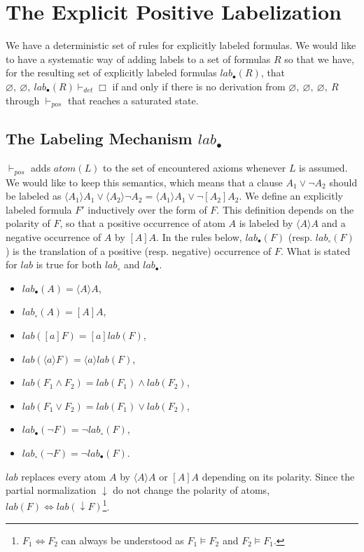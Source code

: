 \documentclass[a4paper,10pt]{article}
\newcommand{\atom}{\mathit{atom}}
\newcommand{\pos}{\vdash_\mathit{pos}}
\newcommand{\dett}{\vdash_\mathit{det}}
\newcommand{\T}{\mathit{lab}}
\begin{document}
\section{The Explicit Positive Labelization}
We have a deterministic set of rules for explicitly labeled formulas. We would like to have a 
systematic way of adding labels to a set of formulas $R$ so that we have, for the resulting set of
explicitly labeled formulas $\T_\bullet(R)$, that
$\varnothing,\ \varnothing,\ \T_\bullet(R)\dett\Box$ if and only if
there is no derivation from $\varnothing,\ \varnothing,\ \varnothing,\ R$ through $\pos$ that reaches
a saturated state.

\subsection{The Labeling Mechanism $\T_\bullet$}
$\pos$ adds $\atom(L)$ to the set of encountered axioms whenever $L$ is assumed. We would like to
keep this semantics, which means that a clause $A_1\vee\neg A_2$ should be labeled as
$\langle A_1\rangle A_1\vee\langle A_2\rangle\neg A_2=\langle A_1\rangle A_1\vee\neg [A_2]A_2$.
We define an explicitly labeled formula $F'$ inductively over the form of $F$. This definition
depends on the polarity of $F$, so that a positive occurrence of atom $A$ is labeled by
$\langle A\rangle A$ and a negative occurrence of $A$ by $[A]A$. In the rules below,
$\T_\bullet(F)$ (resp. $\T_\circ(F)$) is the translation of a positive (resp.
negative) occurrence of $F$. What is stated for $\T$ is true for both $\T_\circ$ and $\T_\bullet$.
\begin{itemize}
 \item $\T_\bullet(A)=\langle A\rangle A$,
 \item $\T_\circ(A)=[A]A$,
 \item $\T([a]F)=[a]\T(F)$,
 \item $\T(\langle a\rangle F)=\langle a\rangle\T(F)$,
 \item $\T(F_1\wedge F_2)=\T(F_1)\wedge\T(F_2)$,
 \item $\T(F_1\vee F_2)=\T(F_1)\vee\T(F_2)$,
 \item $\T_\bullet(\neg F)= \neg\T_\circ(F)$,
 \item $\T_\circ(\neg F)= \neg\T_\bullet(F)$.
\end{itemize}
$\T$ replaces every atom $A$ by $\langle A\rangle A$ or $[A]A$ depending on its polarity. Since
the partial normalization $\downarrow$ do not change the polarity of atoms,
$\T(F)\Leftrightarrow\T(\downarrow F)$\footnote{$F_1\Leftrightarrow F_2$ can always be understood as
$F_1\vDash F_2$ and $F_2\vDash F_1$.}.
\end{document}
